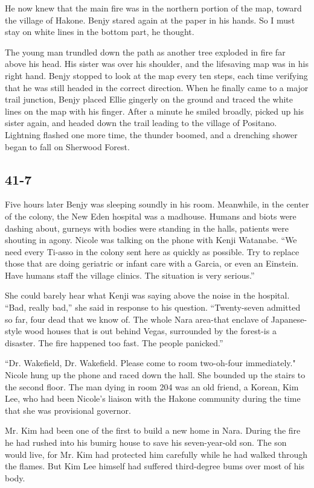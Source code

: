 \documentclass[]{article}
\begin{document}
{He now knew that the main fire was in the northern portion of the map, toward the village of Hakone.  Benjy stared again at the paper in his hands.  So I must stay on white lines in the bottom part, he thought.

The young man trundled down the path as another tree exploded in fire far above his head.  His sister was over his shoulder, and the lifesaving map was in his right hand.  Benjy stopped to look at the map every ten steps, each time verifying that he was still headed in the correct direction.  When he finally came to a major trail junction, Benjy placed Ellie gingerly on the ground and traced the white lines on the map with his finger.  After a minute he smiled broadly, picked up his sister again, and headed down the trail leading to the village of Positano.  Lightning flashed one more time, the thunder boomed, and a drenching shower began to fall on Sherwood Forest.


\subsection*{41-7}

Five hours later Benjy was sleeping soundly in his room.  Meanwhile, in the center of the colony, the New Eden hospital was a madhouse.  Humans and biots were dashing about, gurneys with bodies were standing in the halls, patients were shouting in agony.  Nicole was talking on the phone with Kenji Watanabe.  “We need every Ti-asso in the colony sent here as quickly as possible.  Try to replace those that are doing geriatric or infant care with a Garcia, or even an Einstein.  Have humans staff the village clinics.  The situation is very serious.”

She could barely hear what Kenji was saying above the noise in the hospital.  “Bad, really bad,” she said in response to his question.  “Twenty-seven admitted so far, four dead that we know of.  The whole Nara area-that enclave of Japanese-style wood houses that is out behind Vegas, surrounded by the forest-is a disaster.  The fire happened too fast.  The people panicked.”

“Dr.  Wakefield, Dr.  Wakefield.  Please come to room two-oh-four immediately."  Nicole hung up the phone and raced down the hall.  She bounded up the stairs to the second floor.  The man dying in room 204 was an old friend, a Korean, Kim Lee, who had been Nicole’s liaison with the Hakone community during the time that she was provisional governor.

Mr.  Kim had been one of the first to build a new home in Nara.  During the fire he had rushed into his bumirg house to save his seven-year-old son.  The son would live, for Mr.  Kim had protected him carefully while he had walked through the flames.  But Kim Lee himself had suffered third-degree bums over most of his body.

}
\end{document}
